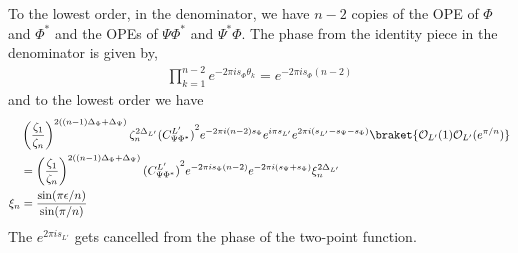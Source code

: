 \documentclass[11pt]{article}
\newcommand{\ep}{\epsilon}
\newcommand{\mO}{\mathcal{O}}
\newcommand{\nn}{\nonumber}
\newcommand{\lb}{\left(}
\newcommand{\rb}{\right)}
\newcommand{\JM}[1]{\textcolor{orange}{#1}}
\begin{document}
To the lowest order, in the denominator, we have $n-2$ copies of the OPE of $\Phi$ and $\Phi^*$ and the OPEs of $\Psi\Phi^*$ and $\Psi^*\Phi$. 
The phase from the identity piece in the denominator is given by,
\begin{align}
  \prod_{k=1}^{n-2}e^{-2\pi i s_\Phi\theta_k}=e^{-2\pi i s_\Phi(n-2)}
\end{align}
and to the lowest order we have
\begin{align}
  &\lb \frac{\zeta_1}{\zeta_n}\rb^{2((n-1)\Delta_\Phi+\Delta_\Psi)}\zeta_n^{2\Delta_{L'}}{(C_{\Psi\Phi^*}^{L'})}^2 e^{-2\pi i (n-2)s_\Phi} e^{i\pi s_{L'}}e^{2 \pi i (s_{L'} - s_\Psi - s_\Phi)}\braket{\mO_{L'}(1)\mO_{L'}(e^{\pi/n})}\nn\\
  &=\lb \frac{\zeta_1}{\zeta_n}\rb^{2((n-1)\Delta_\Phi+\Delta_\Psi)}{(C_{\Psi\Phi^*}^{L'})}^2e^{-2\pi i s_\Phi(n-2)}e^{-2 \pi i( s_\Psi + s_\Phi)}\xi_n^{2\Delta_{L'}}\nn\\
  \xi_n&=\frac{\sin(\pi \ep/n)}{\sin(\pi/n)}
\end{align}
The $e^{2\pi i s_{L'}}$ gets cancelled from the phase of the two-point function.
\end{document}
